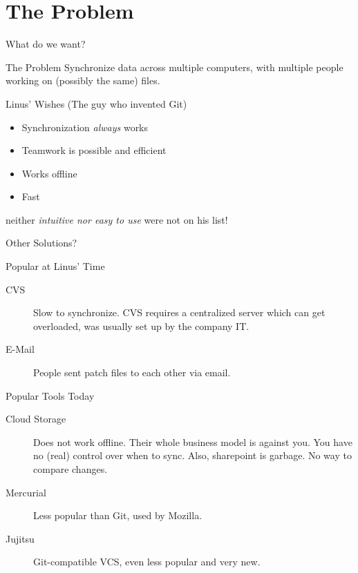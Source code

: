 \documentclass[xetex]{beamer}
\begin{document}

\section{The Problem}

\begin{frame}{What do we want?}
  \begin{alertblock}{The Problem}
    Synchronize data across multiple computers, with multiple people working on
    (possibly the same) files.
  \end{alertblock}
  \pause

  \begin{block}{Linus' Wishes (The guy who invented Git)}
    \begin{itemize}
      \item Synchronization \emph{always} works
      \item Teamwork is possible and efficient
      \item Works offline
      \item Fast
    \end{itemize}
    neither \emph{intuitive nor easy to use} were not on his list!
  \end{block}
\end{frame}

\begin{frame}{Other Solutions?}
  \begin{block}{Popular at Linus' Time}
    \begin{description}
      \item[CVS] Slow to synchronize. CVS requires a centralized server which
        can get overloaded, was usually set up by the company IT.
      \item[E-Mail] People sent patch files to each other via email.
    \end{description}
  \end{block}
  \begin{block}{Popular Tools Today}
    \begin{description}
      \item[Cloud Storage] Does not work offline. Their whole business model is
        against you. You have no (real) control over when to sync. Also,
        sharepoint is garbage. No way to compare changes.

      \item[Mercurial] Less popular than Git, used by Mozilla.

      \item[Jujitsu] Git-compatible VCS, even less popular and very new.
    \end{description}
  \end{block}
\end{frame}
\end{document}
